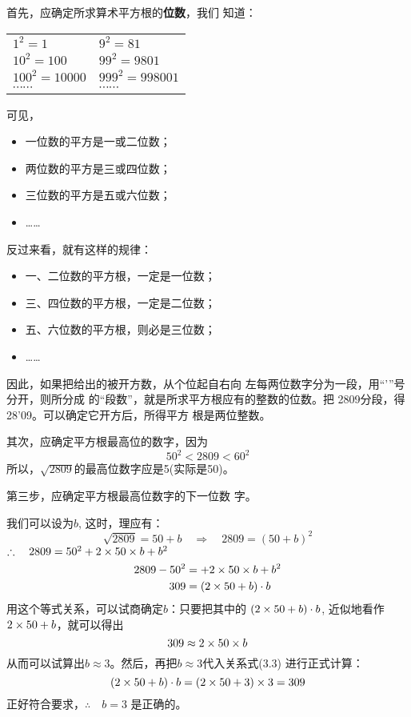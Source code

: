 \begin{solution}
    首先，应确定所求算术平方根的\textbf{位数}，我们
知道：
\begin{center}
    \begin{tabular}{ll}
       $1^2=1$   &  $9^2=81$ \\
       $10^2=100$   &  $99^2=9801$ \\
       $100^2=10000$   &  $999^2=998001$ \\
       $\cdots\cdots$   &  $\cdots\cdots$ \\ 
    \end{tabular}
\end{center}

可见，
\begin{itemize}
    \item 一位数的平方是一或二位数；
    \item 两位数的平方是三或四位数；
    \item 三位数的平方是五或六位数；
    \item ……
\end{itemize}


反过来看，就有这样的规律：
\begin{itemize}
    \item 一、二位数的平方根，一定是一位数；
    \item 三、四位数的平方根，一定是二位数；
    \item 五、六位数的平方根，则必是三位数；
    \item ……
\end{itemize}

因此，如果把给出的被开方数，从个位起自右向
左每两位数字分为一段，用“'”号分开，则所分成
的“段数”，就是所求平方根应有的整数的位数。把
2809分段，得28'09。可以确定它开方后，所得平方
根是两位整数。

其次，应确定平方根最高位的数字，因为
$$50^2<2809<60^2$$
所以，$\sqrt{2809}$的最高位数字应是5(实际是50)。

第三步，应确定平方根最高位数字的下一位数
字。

我们可以设为$b$, 这时，理应有：
\[\sqrt{2809}=50+b  \quad \Rightarrow\quad 2809=(50+b)^2\]
$\therefore\quad 2809=50^2+2\times 50\times b+b^2$
\begin{align}
    2809-50^2&=+2\times 50\times b+b^2 \nonumber \\
    309&=(2\times 50+b)\cdot b
\end{align}
用这个等式关系，可以试商确定$b$：只要把其中的
$(2\times50+b)\cdot b$, 近似地看作$2\times50+b$，就可以得出
\[309\approx 2\times50\times b\]
从而可以试算出$b\approx 3$。然后，再把$b\approx 3$代入关系式(3.3)
进行正式计算：
\[(2\times50+b)\cdot b=(2\times50+3)\times3=309\]
正好符合要求，$\therefore\quad b=3$ 是正确的。


\end{solution}
